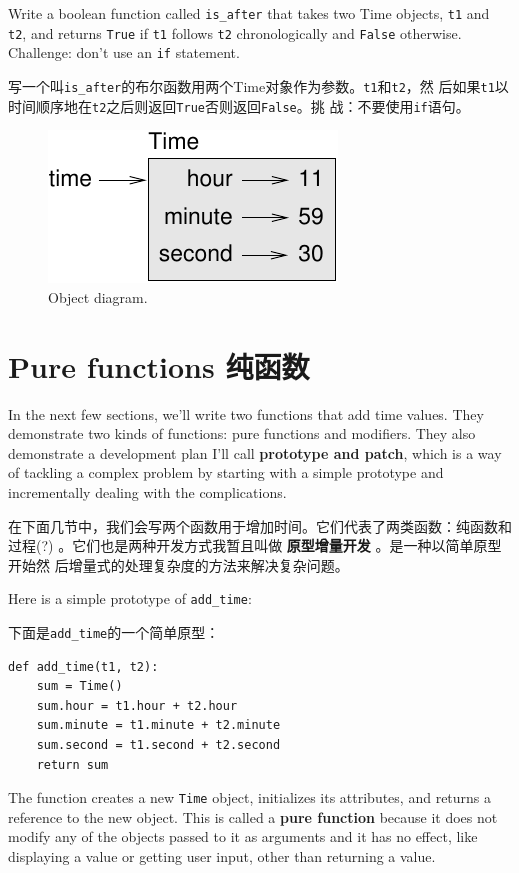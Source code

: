 \documentclass[10pt]{book}
\begin{document}
\begin{CJK}{UTF8}{gbsn}
\begin{exercise}
Write a boolean function called \verb"is_after" that
takes two Time objects, {\tt t1} and {\tt t2}, and
returns {\tt True} if {\tt t1} follows {\tt t2} chronologically and
{\tt False} otherwise.  Challenge: don't use an {\tt if} statement.

写一个叫\verb"is_after"的布尔函数用两个Time对象作为参数。{\tt t1}和{\tt t2}，然
后如果{\tt t1}以时间顺序地在{\tt t2}之后则返回{\tt True}否则返回{\tt False}。挑
战：不要使用{\tt if}语句。
\end{exercise}

\begin{figure}
\centerline
{\includegraphics[scale=0.8]{figs/time.pdf}}
\caption{Object diagram.}
\label{fig.time}
\end{figure}


\section{Pure functions 纯函数}

In the next few sections, we'll write two functions that add time
values.  They demonstrate two kinds of functions: pure functions and
modifiers.  They also demonstrate a development plan I'll call {\bf
  prototype and patch}, which is a way of tackling a complex problem
by starting with a simple prototype and incrementally dealing with the
complications.

在下面几节中，我们会写两个函数用于增加时间。它们代表了两类函数：纯函数和过程(?)
。它们也是两种开发方式我暂且叫做{\bf 
    原型增量开发
}。是一种以简单原型开始然
后增量式的处理复杂度的方法来解决复杂问题。

Here is a simple prototype of \verb"add_time":

下面是\verb"add_time"的一个简单原型：

\begin{verbatim}
def add_time(t1, t2):
    sum = Time()
    sum.hour = t1.hour + t2.hour
    sum.minute = t1.minute + t2.minute
    sum.second = t1.second + t2.second
    return sum
\end{verbatim}
%
The function creates a new {\tt Time} object, initializes its
attributes, and returns a reference to the new object.  This is called
a {\bf pure function} because it does not modify any of the objects
passed to it as arguments and it has no effect,
like displaying a value or getting user input, 
other than returning a value.


\end{CJK}
\end{document}
